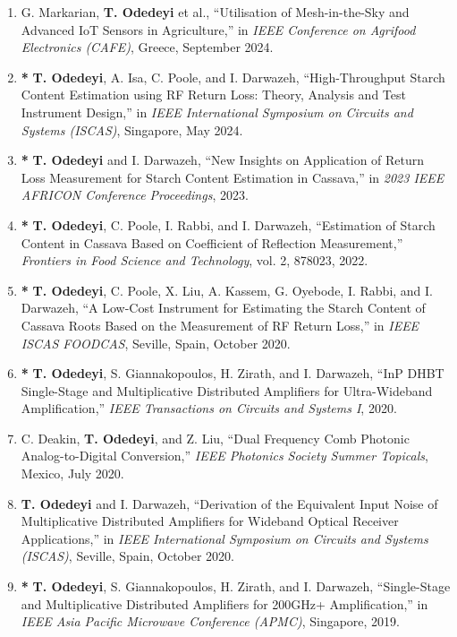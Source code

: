 \documentclass[a4paper,11pt]{article}
\begin{document}
\begin{enumerate}[leftmargin=*]
\item G. Markarian, \textbf{T. Odedeyi} et al., ``Utilisation of Mesh-in-the-Sky and Advanced IoT Sensors in Agriculture,'' in \emph{IEEE Conference on Agrifood Electronics (CAFE)}, Greece, September 2024.

\item \textbf{*} \textbf{T. Odedeyi}, A. Isa, C. Poole, and I. Darwazeh, ``High-Throughput Starch Content Estimation using RF Return Loss: Theory, Analysis and Test Instrument Design,'' in \emph{IEEE International Symposium on Circuits and Systems (ISCAS)}, Singapore, May 2024.

\item \textbf{*} \textbf{T. Odedeyi} and I. Darwazeh, ``New Insights on Application of Return Loss Measurement for Starch Content Estimation in Cassava,'' in \emph{2023 IEEE AFRICON Conference Proceedings}, 2023.

\item \textbf{*} \textbf{T. Odedeyi}, C. Poole, I. Rabbi, and I. Darwazeh, ``Estimation of Starch Content in Cassava Based on Coefficient of Reflection Measurement,'' \emph{Frontiers in Food Science and Technology}, vol. 2, 878023, 2022.

\item \textbf{*} \textbf{T. Odedeyi}, C. Poole, X. Liu, A. Kassem, G. Oyebode, I. Rabbi, and I. Darwazeh, ``A Low-Cost Instrument for Estimating the Starch Content of Cassava Roots Based on the Measurement of RF Return Loss,'' in \emph{IEEE ISCAS FOODCAS}, Seville, Spain, October 2020.

\item \textbf{*} \textbf{T. Odedeyi}, S. Giannakopoulos, H. Zirath, and I. Darwazeh, ``InP DHBT Single-Stage and Multiplicative Distributed Amplifiers for Ultra-Wideband Amplification,'' \emph{IEEE Transactions on Circuits and Systems I}, 2020.

\item C. Deakin, \textbf{T. Odedeyi}, and Z. Liu, ``Dual Frequency Comb Photonic Analog-to-Digital Conversion,'' \emph{IEEE Photonics Society Summer Topicals}, Mexico, July 2020.

\item \textbf{T. Odedeyi} and I. Darwazeh, ``Derivation of the Equivalent Input Noise of Multiplicative Distributed Amplifiers for Wideband Optical Receiver Applications,'' in \emph{IEEE International Symposium on Circuits and Systems (ISCAS)}, Seville, Spain, October 2020.

\item \textbf{*} \textbf{T. Odedeyi}, S. Giannakopoulos, H. Zirath, and I. Darwazeh, ``Single-Stage and Multiplicative Distributed Amplifiers for 200GHz+ Amplification,'' in \emph{IEEE Asia Pacific Microwave Conference (APMC)}, Singapore, 2019.


\end{enumerate}
\end{document}
